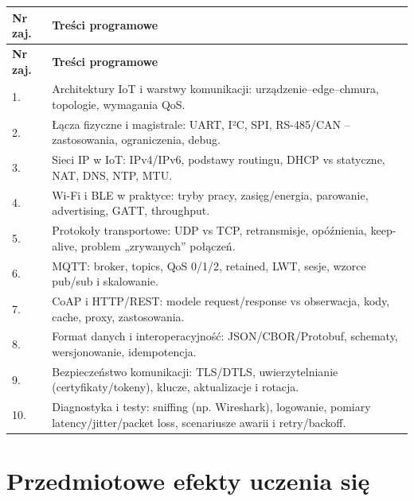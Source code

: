 \documentclass[12pt, a4paper]{article}
\newcommand{\thdrule}{\noalign{\global\setlength{\extrarowheight}{0pt}}}
\newcommand{\thdend}{\noalign{\global\setlength{\extrarowheight}{3pt}}}
\begin{document}
{\scriptsize
\begin{longtable}{m{1.5cm}m{14.5cm}}
\thdrule\toprule
\rowcolor{pjatkRed} {\color{white}\textbf{Nr zaj.}} & {\color{white}\textbf{Treści programowe}} \\
\midrule\thdend
\endfirsthead
\thdrule\toprule
\rowcolor{pjatkRed} {\color{white}\textbf{Nr zaj.}} & {\color{white}\textbf{Treści programowe}} \\
\midrule\thdend
\endhead
  \rowcolor{tableRowLight} 1. & Architektury IoT i warstwy komunikacji: urządzenie–edge–chmura, topologie, wymagania QoS. \\
  \rowcolor{tableRowAlt} 2. & Łącza fizyczne i magistrale: UART, I²C, SPI, RS-485/CAN – zastosowania, ograniczenia, debug. \\
  \rowcolor{tableRowLight} 3. & Sieci IP w IoT: IPv4/IPv6, podstawy routingu, DHCP vs statyczne, NAT, DNS, NTP, MTU. \\
  \rowcolor{tableRowAlt} 4. & Wi-Fi i BLE w praktyce: tryby pracy, zasięg/energia, parowanie, advertising, GATT, throughput. \\
  \rowcolor{tableRowLight} 5. & Protokoły transportowe: UDP vs TCP, retransmisje, opóźnienia, keep-alive, problem „zrywanych” połączeń. \\
  \rowcolor{tableRowAlt} 6. & MQTT: broker, topics, QoS 0/1/2, retained, LWT, sesje, wzorce pub/sub i skalowanie. \\
  \rowcolor{tableRowLight} 7. & CoAP i HTTP/REST: modele request/response vs obserwacja, kody, cache, proxy, zastosowania. \\
  \rowcolor{tableRowAlt} 8. & Format danych i interoperacyjność: JSON/CBOR/Protobuf, schematy, wersjonowanie, idempotencja. \\
  \rowcolor{tableRowLight} 9. & Bezpieczeństwo komunikacji: TLS/DTLS, uwierzytelnianie (certyfikaty/tokeny), klucze, aktualizacje i rotacja. \\
  \rowcolor{tableRowAlt} 10. & Diagnostyka i testy: sniffing (np. Wireshark), logowanie, pomiary latency/jitter/packet loss, scenariusze awarii i retry/backoff. \\
\bottomrule
\end{longtable}}

\section{Przedmiotowe efekty uczenia się}
\end{document}
